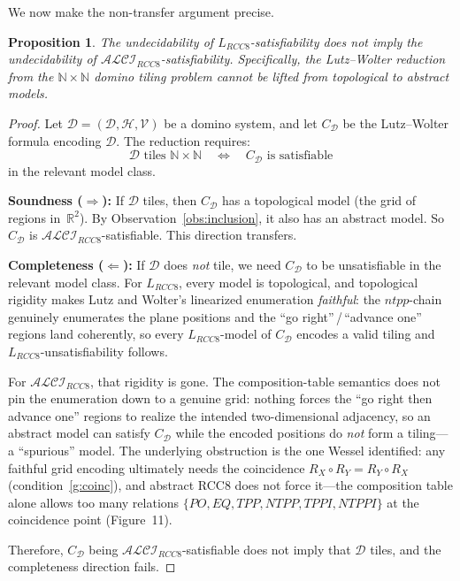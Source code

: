 \documentclass[11pt]{article}
\newtheorem{proposition}[theorem]{Proposition}
\newcommand{\ALCIRCC}[1]{\ensuremath{\mathcal{ALCI}_{\mathit{RCC#1}}}}
\newcommand{\LRCC}[1]{\ensuremath{L_{\mathit{RCC#1}}}}
\newcommand{\reals}{\mathbb{R}}
\newcommand{\naturals}{\mathbb{N}}
\begin{document}
We now make the non-transfer argument precise.

\begin{proposition}\label{prop:nontransfer}
  The undecidability of $\LRCC{8}$-satisfiability does not imply the
  undecidability of $\ALCIRCC{8}$-satisfiability.  Specifically, the
  Lutz--Wolter reduction from the $\naturals \times \naturals$ domino tiling
  problem cannot be lifted from topological to abstract models.
\end{proposition}

\begin{proof}
  Let $\mathcal{D} = (\mathcal{D}, \mathcal{H}, \mathcal{V})$ be a domino
  system, and let $C_\mathcal{D}$ be the Lutz--Wolter formula encoding
  $\mathcal{D}$.  The reduction requires:
  \[
  \mathcal{D} \text{ tiles } \naturals \times \naturals
  \quad\Longleftrightarrow\quad
  C_\mathcal{D} \text{ is satisfiable}
  \]
  in the relevant model class.

  \textbf{Soundness ($\Rightarrow$):}
  If $\mathcal{D}$ tiles, then $C_\mathcal{D}$ has a topological model (the
  grid of regions in~$\reals^2$).  By Observation~\ref{obs:inclusion}, it
  also has an abstract model.  So $C_\mathcal{D}$ is $\ALCIRCC{8}$-satisfiable.
  This direction transfers.

  \textbf{Completeness ($\Leftarrow$):}
  If $\mathcal{D}$ does \emph{not} tile, we need $C_\mathcal{D}$ to be
  unsatisfiable in the relevant model class.  For $\LRCC{8}$, every model is
  topological, and topological rigidity makes Lutz and Wolter's linearized
  enumeration \emph{faithful}: the $ntpp$-chain genuinely enumerates the plane
  positions and the ``go right''\,/\,``advance one'' regions land coherently,
  so every $\LRCC{8}$-model of $C_\mathcal{D}$ encodes a valid tiling and
  $\LRCC{8}$-unsatisfiability follows.

  For $\ALCIRCC{8}$, that rigidity is gone.  The composition-table semantics
  does not pin the enumeration down to a genuine grid: nothing forces the
  ``go right then advance one'' regions to realize the intended
  two-dimensional adjacency, so an abstract model can satisfy $C_\mathcal{D}$
  while the encoded positions do \emph{not} form a tiling---a ``spurious''
  model.  The underlying obstruction is the one Wessel identified: any faithful
  grid encoding ultimately needs the coincidence
  $R_X \circ R_Y = R_Y \circ R_X$ (condition~\ref{g:coinc}), and abstract RCC8
  does not force it---the composition table alone allows too many relations
  $\{PO, EQ, TPP, NTPP, TPPI, NTPPI\}$ at the coincidence point (Figure~11).

  Therefore, $C_\mathcal{D}$ being $\ALCIRCC{8}$-satisfiable does not
  imply that $\mathcal{D}$ tiles, and the completeness direction fails.
  \qedhere
\end{proof}
\end{document}
